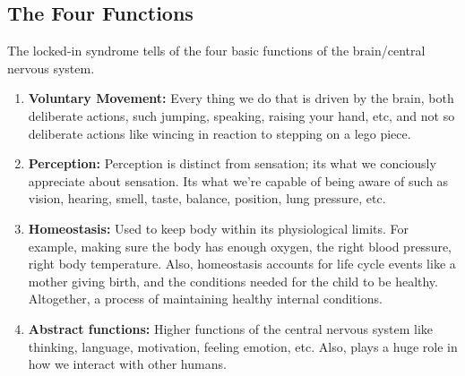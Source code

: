 \documentclass[12pt, a4paper]{article}
\begin{document}
\subsection{The Four Functions}
The locked-in syndrome tells of the four basic functions of the brain/central nervous system.
\begin{enumerate}
    \item \textbf{Voluntary Movement:} Every thing we do that is driven by the brain,
    both deliberate actions, such jumping, speaking, raising your hand, etc, and not so deliberate
    actions like wincing in reaction to stepping on a lego piece.
    \item \textbf{Perception:} Perception is distinct from sensation; its what we conciously
    appreciate about sensation. Its what we're capable of being aware of such as vision, hearing,
    smell, taste, balance, position, lung pressure, etc.
    \item \textbf{Homeostasis:} Used to keep body within its physiological limits.
    For example, making sure the body has enough oxygen, the right blood pressure, right body temperature.
    Also, homeostasis accounts for life cycle events like a mother giving birth, and the conditions 
    needed for the child to be healthy. Altogether, a process of maintaining healthy internal conditions.
    \item \textbf{Abstract functions:} Higher functions of the central nervous system like
    thinking, language, motivation, feeling emotion, etc. Also, plays a huge role in how we interact with other humans.
\end{enumerate}
\end{document}
